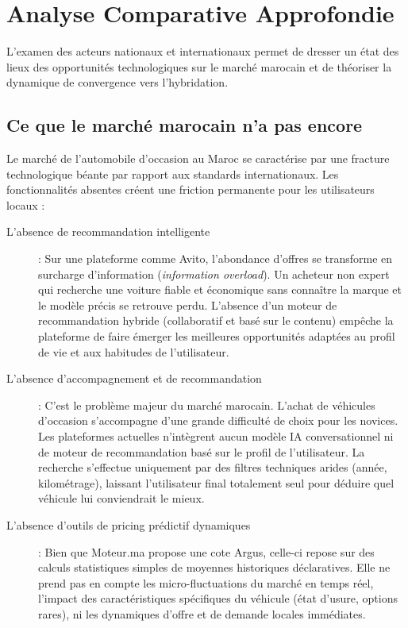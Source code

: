 \documentclass[11pt,a4paper]{article}
\begin{document}
\newpage

\section{Analyse Comparative Approfondie}

L'examen des acteurs nationaux et internationaux permet de dresser un état des lieux des opportunités technologiques sur le marché marocain et de théoriser la dynamique de convergence vers l'hybridation.

\subsection{Ce que le marché marocain n'a pas encore}
Le marché de l'automobile d'occasion au Maroc se caractérise par une fracture technologique béante par rapport aux standards internationaux. Les fonctionnalités absentes créent une friction permanente pour les utilisateurs locaux :

\begin{description}
    \item[L'absence de recommandation intelligente] : Sur une plateforme comme Avito, l'abondance d'offres se transforme en surcharge d'information (\textit{information overload}). Un acheteur non expert qui recherche une voiture fiable et économique sans connaître la marque et le modèle précis se retrouve perdu. L'absence d'un moteur de recommandation hybride (collaboratif et basé sur le contenu) empêche la plateforme de faire émerger les meilleures opportunités adaptées au profil de vie et aux habitudes de l'utilisateur.
    \item[L'absence d'accompagnement et de recommandation] : C'est le problème majeur du marché marocain. L'achat de véhicules d'occasion s'accompagne d'une grande difficulté de choix pour les novices. Les plateformes actuelles n'intègrent aucun modèle IA conversationnel ni de moteur de recommandation basé sur le profil de l'utilisateur. La recherche s'effectue uniquement par des filtres techniques arides (année, kilométrage), laissant l'utilisateur final totalement seul pour déduire quel véhicule lui conviendrait le mieux.
    \item[L'absence d'outils de pricing prédictif dynamiques] : Bien que Moteur.ma propose une cote Argus, celle-ci repose sur des calculs statistiques simples de moyennes historiques déclaratives. Elle ne prend pas en compte les micro-fluctuations du marché en temps réel, l'impact des caractéristiques spécifiques du véhicule (état d'usure, options rares), ni les dynamiques d'offre et de demande locales immédiates.
\end{description}
\end{document}
